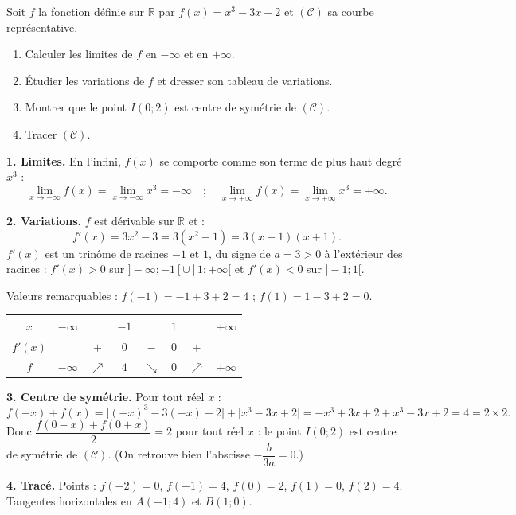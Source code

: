 \documentclass[11pt]{article}
\begin{document}
\begin{exoresolu}
Soit $f$ la fonction définie sur $\mathbb{R}$ par $f(x)=x^3-3x+2$ et $(\mathcal{C})$ sa courbe représentative.
\begin{enumerate}
\item Calculer les limites de $f$ en $-\infty$ et en $+\infty$.
\item Étudier les variations de $f$ et dresser son tableau de variations.
\item Montrer que le point $I(0;2)$ est centre de symétrie de $(\mathcal{C})$.
\item Tracer $(\mathcal{C})$.
\end{enumerate}
\tcblower
\textbf{1. Limites.} En l'infini, $f(x)$ se comporte comme son terme de plus haut degré $x^3$ :
\[\lim_{x\to-\infty}f(x)=\lim_{x\to-\infty}x^3=-\infty \quad ; \quad \lim_{x\to+\infty}f(x)=\lim_{x\to+\infty}x^3=+\infty.\]

\textbf{2. Variations.} $f$ est dérivable sur $\mathbb{R}$ et :
\[f'(x)=3x^2-3=3(x^2-1)=3(x-1)(x+1).\]
$f'(x)$ est un trinôme de racines $-1$ et $1$, du signe de $a=3>0$ à l'extérieur des racines : $f'(x)>0$ sur $]-\infty;-1[\cup]1;+\infty[$ et $f'(x)<0$ sur $]-1;1[$.

Valeurs remarquables : $f(-1)=-1+3+2=4$ ; $f(1)=1-3+2=0$.

\begin{center}
\begin{tabular}{|c|ccccccc|}\hline
$x$ & $-\infty$ & & $-1$ & & $1$ & & $+\infty$ \\ \hline
$f'(x)$ & & $+$ & $0$ & $-$ & $0$ & $+$ & \\ \hline
$f$ & $-\infty$ & $\nearrow$ & $4$ & $\searrow$ & $0$ & $\nearrow$ & $+\infty$ \\ \hline
\end{tabular}
\end{center}

\textbf{3. Centre de symétrie.} Pour tout réel $x$ :
\[f(-x)+f(x)=\big[(-x)^3-3(-x)+2\big]+\big[x^3-3x+2\big]=-x^3+3x+2+x^3-3x+2=4=2\times 2.\]
Donc $\dfrac{f(0-x)+f(0+x)}{2}=2$ pour tout réel $x$ : le point $I(0;2)$ est centre de symétrie de $(\mathcal{C})$. (On retrouve bien l'abscisse $-\dfrac{b}{3a}=0$.)

\textbf{4. Tracé.} Points : $f(-2)=0$, $f(-1)=4$, $f(0)=2$, $f(1)=0$, $f(2)=4$. Tangentes horizontales en $A(-1;4)$ et $B(1;0)$.


\end{exoresolu}
\end{document}
